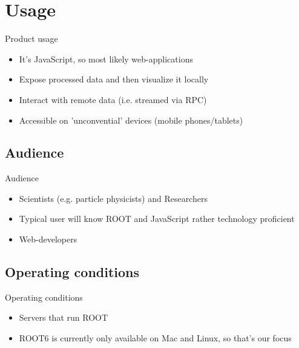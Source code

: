 \section{Usage}
\begin{frame}{Product usage}
        \begin{itemize}
		\item It's JavaScript, so most likely web-applications
		\item Expose processed data and then visualize it locally
		\item Interact with remote data (i.e. streamed via RPC)
		\item Accessible on 'unconvential' devices (mobile phones/tablets)
        \end{itemize}
\end{frame}


\subsection{Audience}
\begin{frame}{Audience}
        \begin{itemize}
		\item Scientists (e.g. particle physicists) and Researchers
		\item Typical user will know ROOT and JavaScript rather technology proficient
		\item Web-developers
        \end{itemize}
\end{frame}

\subsection{Operating conditions}
\begin{frame}{Operating conditions}
        \begin{itemize}
                \item Servers that run ROOT
                \item ROOT6 is currently only available on Mac and Linux, so that's our focus
        \end{itemize}
\end{frame}
